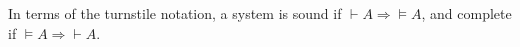 

\setcounter{section}{2}
\setcounter{subsection}{2}
\setcounter{dfn}{3}


In terms of the turnstile notation, a system is sound if $\vdash A \Rightarrow  \vDash A$, and complete if $\vDash A \Rightarrow \vdash A$.



